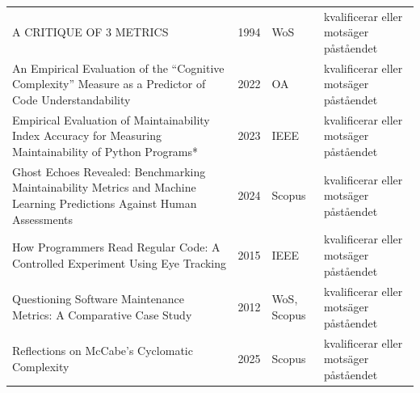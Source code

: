 \begin{longtable}{@{}%
  >{\raggedright\arraybackslash}p{}c%
  >{\raggedright\arraybackslash}p{}%
  >{\raggedright\arraybackslash}p{}@{}}
A CRITIQUE OF 3 METRICS & 1994 & WoS & kvalificerar eller motsäger påståendet \\
An Empirical Evaluation of the ``Cognitive Complexity'' Measure as a Predictor of Code Understandability & 2022 & OA & kvalificerar eller motsäger påståendet \\
Empirical Evaluation of Maintainability Index Accuracy for Measuring Maintainability of Python Programs* & 2023 & IEEE & kvalificerar eller motsäger påståendet \\
Ghost Echoes Revealed: Benchmarking Maintainability Metrics and Machine Learning Predictions Against Human Assessments & 2024 & Scopus & kvalificerar eller motsäger påståendet \\
How Programmers Read Regular Code: A Controlled Experiment Using Eye Tracking & 2015 & IEEE & kvalificerar eller motsäger påståendet \\
Questioning Software Maintenance Metrics: A Comparative Case Study & 2012 & WoS, Scopus & kvalificerar eller motsäger påståendet \\
Reflections on McCabe's Cyclomatic Complexity & 2025 & Scopus & kvalificerar eller motsäger påståendet \\
\end{longtable}
\endgroup
